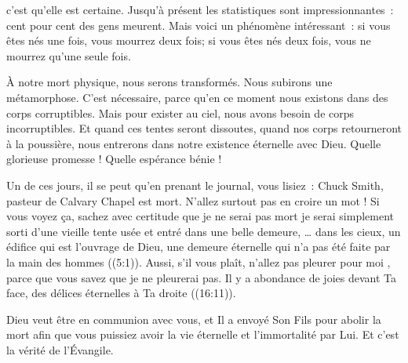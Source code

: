  c'est qu'elle est certaine.
 Jusqu'à présent les statistiques sont impressionnantes~:
 cent pour cent des gens meurent. Mais voici un phénomène intéressant~:
 si vous êtes nés une fois, vous mourrez deux fois;
 si vous êtes nés deux fois, vous ne mourrez qu'une seule fois.

À notre mort physique, nous serons transformés.
 Nous subirons une métamorphose. C'est nécessaire, parce qu'en ce moment
 nous existons dans des corps corruptibles. Mais pour exister au ciel,
 nous avons besoin de corps incorruptibles. Et quand ces tentes
 seront dissoutes, quand nos corps retourneront à la poussière,
 nous entrerons dans notre existence éternelle avec Dieu.
 Quelle glorieuse promesse ! Quelle espérance bénie ! 


Un de ces jours, il se peut qu'en prenant le journal,
 vous lisiez~: 
 \og Chuck Smith, pasteur de Calvary Chapel est mort. \fg{}
 N'allez surtout pas en croire un mot ! Si vous voyez ça,
 sachez avec certitude que je ne serai pas mort \ocadr je serai simplement
 sorti d'une vieille tente usée et entré dans une belle demeure,
 \og \dots{} 
 dans les cieux, un édifice qui est l'ouvrage de Dieu, une demeure éternelle
 qui n'a pas été faite par la main des hommes \fg{} ((5:1)).
 Aussi, s'il vous plaît, n'allez pas pleurer pour moi
 , parce que vous savez que je ne pleurerai pas.
 \og Il y a abondance de joies devant Ta face, des délices éternelles
 à Ta droite \fg{} ((16:11)). 

Dieu veut être en communion avec vous, et Il a envoyé Son Fils pour abolir
 la mort afin que vous puissiez avoir la vie éternelle
 et l'immortalité par Lui. Et c'est la vérité de l'Évangile.

\dvrule






